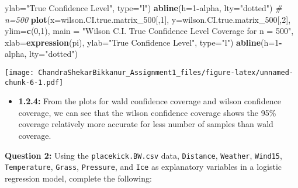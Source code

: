 \documentclass[]{article}
\newenvironment{Shaded}{\begin{snugshade}}{\end{snugshade}}
\newcommand{\CommentTok}[1]{\textcolor[rgb]{0.56,0.35,0.01}{\textit{#1}}}
\newcommand{\DataTypeTok}[1]{\textcolor[rgb]{0.13,0.29,0.53}{#1}}
\newcommand{\DecValTok}[1]{\textcolor[rgb]{0.00,0.00,0.81}{#1}}
\newcommand{\KeywordTok}[1]{\textcolor[rgb]{0.13,0.29,0.53}{\textbf{#1}}}
\newcommand{\NormalTok}[1]{#1}
\newcommand{\OperatorTok}[1]{\textcolor[rgb]{0.81,0.36,0.00}{\textbf{#1}}}
\newcommand{\StringTok}[1]{\textcolor[rgb]{0.31,0.60,0.02}{#1}}
\providecommand{\tightlist}{%
  \setlength{\itemsep}{0pt}\setlength{\parskip}{0pt}}
\begin{document}
\begin{Shaded}
\begin{Highlighting}[]
     \DataTypeTok{ylab=}\StringTok{"True Confidence Level"}\NormalTok{,}
     \DataTypeTok{type=}\StringTok{"l"}\NormalTok{)}
\KeywordTok{abline}\NormalTok{(}\DataTypeTok{h=}\DecValTok{1}\OperatorTok{-}\NormalTok{alpha, }\DataTypeTok{lty=}\StringTok{"dotted"}\NormalTok{)}
\CommentTok{# n=500}
\KeywordTok{plot}\NormalTok{(}\DataTypeTok{x=}\NormalTok{wilson.CI.true.matrix_}\DecValTok{500}\NormalTok{[,}\DecValTok{1}\NormalTok{],}
     \DataTypeTok{y=}\NormalTok{wilson.CI.true.matrix_}\DecValTok{500}\NormalTok{[,}\DecValTok{2}\NormalTok{],}
     \DataTypeTok{ylim=}\KeywordTok{c}\NormalTok{(}\DecValTok{0}\NormalTok{,}\DecValTok{1}\NormalTok{),}
     \DataTypeTok{main =} \StringTok{"Wilson C.I. True Confidence Level Coverage for n = 500"}\NormalTok{, }\DataTypeTok{xlab=}\KeywordTok{expression}\NormalTok{(pi),}
     \DataTypeTok{ylab=}\StringTok{"True Confidence Level"}\NormalTok{,}
     \DataTypeTok{type=}\StringTok{"l"}\NormalTok{)}
\KeywordTok{abline}\NormalTok{(}\DataTypeTok{h=}\DecValTok{1}\OperatorTok{-}\NormalTok{alpha, }\DataTypeTok{lty=}\StringTok{"dotted"}\NormalTok{)}
\end{Highlighting}
\end{Shaded}

\texttt{[image: ChandraShekarBikkanur\_Assignment1\_files/figure-latex/unnamed-chunk-6-1.pdf]}

\vspace{0.25in}

\begin{itemize}
\tightlist
\item
  \textbf{1.2.4:} From the plots for wald confidence coverage and wilson
  confidence coverage, we can see that the wilson confidence coverage
  shows the 95\% coverage relatively more accurate for less number of
  samples than wald coverage. \newpage
\end{itemize}

\textbf{Question 2:} Using the \texttt{placekick.BW.csv} data,
\texttt{Distance}, \texttt{Weather}, \texttt{Wind15},
\texttt{Temperature}, \texttt{Grass}, \texttt{Pressure}, and
\texttt{Ice} as explanatory variables in a logistic regression model,
complete the following:
\end{document}

